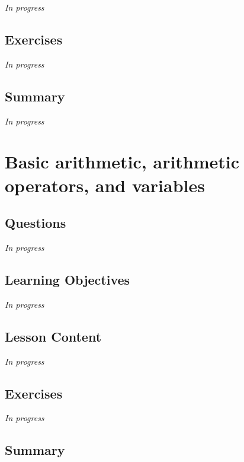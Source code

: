 \documentclass[
  letterpaper,
  DIV=11,
  numbers=noendperiod]{scrreprt}
\begin{document}
\emph{In progress}

\hypertarget{exercises-4}{%
\section{Exercises}\label{exercises-4}}

\emph{In progress}

\hypertarget{summary-5}{%
\section{Summary}\label{summary-5}}

\emph{In progress}


\hypertarget{sec-arithmetic-variables}{%
\chapter{Basic arithmetic, arithmetic operators, and
variables}\label{sec-arithmetic-variables}}

\hypertarget{questions-5}{%
\section{Questions}\label{questions-5}}

\emph{In progress}

\hypertarget{learning-objectives-5}{%
\section{Learning Objectives}\label{learning-objectives-5}}

\emph{In progress}

\hypertarget{lesson-content-5}{%
\section{Lesson Content}\label{lesson-content-5}}

\emph{In progress}

\hypertarget{exercises-5}{%
\section{Exercises}\label{exercises-5}}

\emph{In progress}

\hypertarget{summary-6}{%
\section{Summary}\label{summary-6}}
\end{document}
